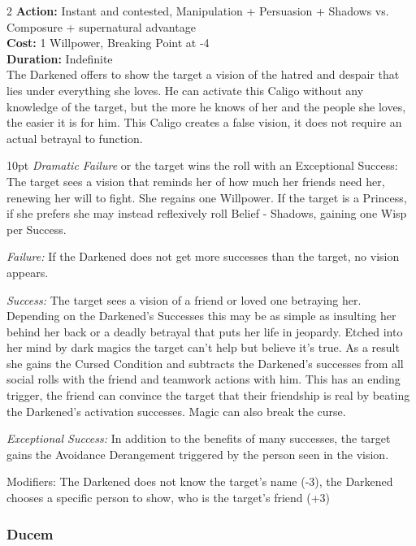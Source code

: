 \begin{multicols}{2}
\noindent \textbf{Action:} Instant and contested, Manipulation + Persuasion + Shadows vs. Composure + supernatural advantage\\

\noindent \textbf{Cost:} 1 Willpower, Breaking Point at -4\\

\noindent \textbf{Duration:} Indefinite \\

\noindent The Darkened offers to show the target a vision of the hatred and despair that lies under everything she loves. He can activate this Caligo without any knowledge of the target, but the more he knows of her and the people she loves, the easier it is for him. This Caligo creates a false vision, it does not require an actual betrayal to function.

   \begin{myindentpar}{10pt} \emph{Dramatic Failure} or the target wins the roll with an Exceptional Success: The target sees a vision that reminds her of how much her friends need her, renewing her will to fight. She regains one Willpower. If the target is a Princess, if she prefers she may instead reflexively roll Belief - Shadows, gaining one Wisp per Success.

    \emph{Failure:} If the Darkened does not get more successes than the target, no vision appears.

    \emph{Success:} The target sees a vision of a friend or loved one betraying her. Depending on the Darkened's Successes this may be as simple as insulting her behind her back or a deadly betrayal that puts her life in jeopardy. Etched into her mind by dark magics the target can't help but believe it's true. As a result she gains the Cursed Condition and subtracts the Darkened's successes from all social rolls with the friend and teamwork actions with him. This has an ending trigger, the friend can convince the target that their friendship is real by beating the Darkened's activation successes. Magic can also break the curse. 

    \emph{Exceptional Success:} In addition to the benefits of many successes, the target gains the Avoidance Derangement triggered by the person seen in the vision.

Modifiers: The Darkened does not know the target's name (-3), the Darkened chooses a specific person to show, who is the target's friend (+3) \end{myindentpar}

\subsubsection*{Ducem}


\end{multicols}
